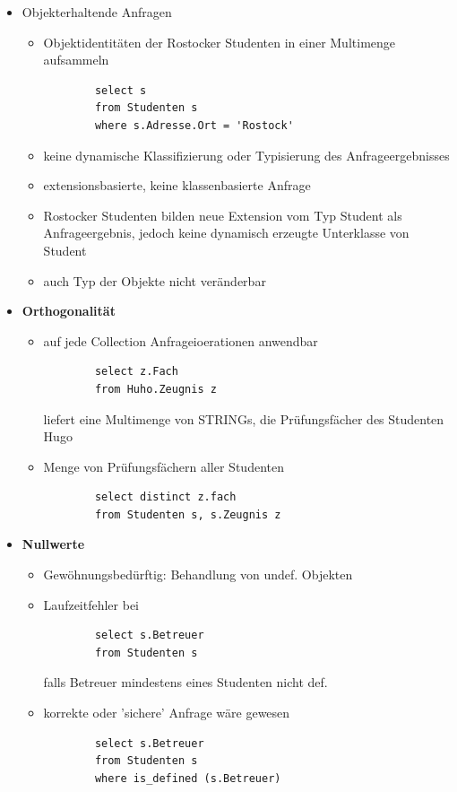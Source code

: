\begin{itemize}
	\item Objekterhaltende Anfragen
	\begin{itemize}
		\item Objektidentitäten der Rostocker Studenten in einer Multimenge aufsammeln
		\begin{lstlisting}
		select s
		from Studenten s
		where s.Adresse.Ort = 'Rostock'
		\end{lstlisting}
		
		\item keine dynamische Klassifizierung oder Typisierung des Anfrageergebnisses
		\item extensionsbasierte, keine klassenbasierte Anfrage
		\item Rostocker Studenten bilden neue Extension vom Typ Student als Anfrageergebnis, jedoch keine dynamisch erzeugte Unterklasse von Student
		\item auch Typ der Objekte nicht veränderbar
	\end{itemize}
	
	\item \textbf{Orthogonalität}
	\begin{itemize}
		\item auf jede Collection Anfrageioerationen anwendbar
		\begin{lstlisting}
		select z.Fach
		from Huho.Zeugnis z
		\end{lstlisting}
		liefert eine Multimenge von STRINGs, die Prüfungsfächer des Studenten Hugo
		\item Menge von Prüfungsfächern aller Studenten
		\begin{lstlisting}
		select distinct z.fach
		from Studenten s, s.Zeugnis z
		\end{lstlisting}
	\end{itemize}
	
	\item \textbf{Nullwerte}
	\begin{itemize}
		\item Gewöhnungsbedürftig: Behandlung von undef. Objekten 
		\item Laufzeitfehler bei 
		\begin{lstlisting}
		select s.Betreuer
		from Studenten s
		\end{lstlisting}
		falls Betreuer mindestens eines Studenten nicht def.
		\item korrekte oder 'sichere' Anfrage wäre gewesen
		\begin{lstlisting}
		select s.Betreuer
		from Studenten s
		where is_defined (s.Betreuer)
		\end{lstlisting}
	\end{itemize}
	

\end{itemize}
